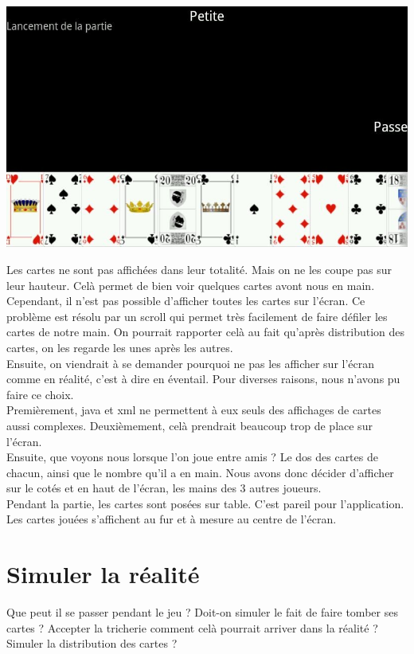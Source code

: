 \documentclass[a4paper]{report}
\begin{document}
		\begin{center}
			\includegraphics[scale=0.6]{Images/main.jpg}
		\end{center}
		Les cartes ne sont pas affichées dans leur totalité. Mais on ne les coupe pas sur leur hauteur. Celà permet de bien voir quelques cartes avont nous en main.\\
		Cependant, il n’est pas possible d’afficher toutes les cartes sur l’écran. Ce problème est résolu par un scroll qui permet très facilement de faire défiler les cartes de notre main.
		On pourrait rapporter celà au fait qu’après distribution des cartes, on les regarde les unes après les autres.\\
		Ensuite, on viendrait à se demander pourquoi ne pas les afficher sur l’écran comme en réalité, c’est à dire en éventail. Pour diverses raisons, nous n’avons pu faire ce choix.\\ 		Premièrement, java et xml ne permettent à eux seuls des affichages de cartes aussi complexes. Deuxièmement, celà prendrait beaucoup trop de place sur l’écran.\\

		Ensuite, que voyons nous lorsque l’on joue entre amis ? Le dos des cartes de chacun, ainsi que le nombre qu’il a en main. Nous avons donc décider d’afficher sur le cotés et en haut de 		l’écran, les mains des 3 autres joueurs.\\
		Pendant la partie, les cartes sont posées sur table. C’est pareil pour l’application. Les cartes jouées s’affichent au fur et à mesure au centre de l’écran.
		
	
	\section{Simuler la réalité}
		Que peut il se passer pendant le jeu ? Doit-on simuler le fait de faire tomber ses cartes ? Accepter la tricherie comment celà pourrait arriver dans la réalité ? Simuler la distribution 			des cartes ?\\
\end{document}
